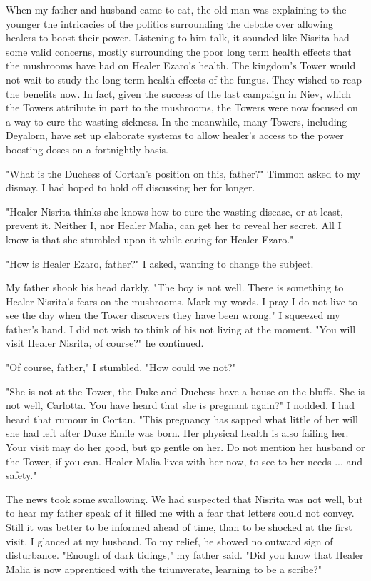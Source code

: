 \documentclass{article}
\begin{document}
When my father and husband came to eat, the old man was explaining to the younger the intricacies of the politics surrounding the debate over allowing healers to boost their power. Listening to him talk, it sounded like Nisrita had some valid concerns, mostly surrounding the poor long term health effects that the mushrooms have had on Healer Ezaro's health. The kingdom's Tower would not wait to study the long term health effects of the fungus. They wished to reap the benefits now. In fact, given the success of the last campaign in Niev, which the Towers attribute in part to the mushrooms, the Towers were now focused on a way to cure the wasting sickness. In the meanwhile, many Towers, including Deyalorn, have set up elaborate systems to allow healer's access to the power boosting doses on a fortnightly basis.

"What is the Duchess of Cortan's position on this, father?" Timmon asked to my dismay. I had hoped to hold off discussing her for longer. 

"Healer Nisrita thinks she knows how to cure the wasting disease, or at least, prevent it. Neither I, nor Healer Malia, can get her to reveal her secret. All I know is that she stumbled upon it while caring for Healer Ezaro."

"How is Healer Ezaro, father?" I asked, wanting to change the subject.

My father shook his head darkly. "The boy is not well. There is something to Healer Nisrita's fears on the mushrooms. Mark my words. I pray I do not live to see the day when the Tower discovers they have been wrong." I squeezed my father's hand. I did not wish to think of his not living at the moment. "You will visit Healer Nisrita, of course?" he continued.

"Of course, father," I stumbled. "How could we not?"

"She is not at the Tower, the Duke and Duchess have a house on the bluffs. She is not well, Carlotta. You have heard that she is pregnant again?" I nodded. I had heard that rumour in Cortan. "This pregnancy has sapped what little of her will she had left after Duke Emile was born. Her physical health is also failing her. Your visit may do her good, but go gentle on her. Do not mention her husband or the Tower, if you can. Healer Malia lives with her now, to see to her needs ... and safety."

The news took some swallowing. We had suspected that Nisrita was not well, but to hear my father speak of it filled me with a fear that letters could not convey. Still it was better to be informed ahead of time, than to be shocked at the first visit. I glanced at my husband. To my relief, he showed no outward sign of disturbance. "Enough of dark tidings," my father said. "Did you know that Healer Malia is now apprenticed with the triumverate, learning to be a scribe?"
\end{document}
